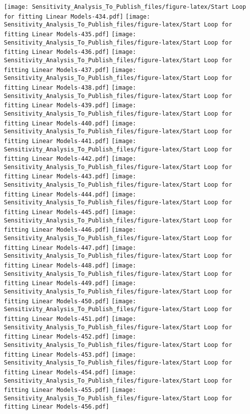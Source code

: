 \documentclass[
]{article}
\begin{document}
\texttt{[image: Sensitivity\_Analysis\_To\_Publish\_files/figure-latex/Start Loop for fitting Linear Models-434.pdf]}
\texttt{[image: Sensitivity\_Analysis\_To\_Publish\_files/figure-latex/Start Loop for fitting Linear Models-435.pdf]}
\texttt{[image: Sensitivity\_Analysis\_To\_Publish\_files/figure-latex/Start Loop for fitting Linear Models-436.pdf]}
\texttt{[image: Sensitivity\_Analysis\_To\_Publish\_files/figure-latex/Start Loop for fitting Linear Models-437.pdf]}
\texttt{[image: Sensitivity\_Analysis\_To\_Publish\_files/figure-latex/Start Loop for fitting Linear Models-438.pdf]}
\texttt{[image: Sensitivity\_Analysis\_To\_Publish\_files/figure-latex/Start Loop for fitting Linear Models-439.pdf]}
\texttt{[image: Sensitivity\_Analysis\_To\_Publish\_files/figure-latex/Start Loop for fitting Linear Models-440.pdf]}
\texttt{[image: Sensitivity\_Analysis\_To\_Publish\_files/figure-latex/Start Loop for fitting Linear Models-441.pdf]}
\texttt{[image: Sensitivity\_Analysis\_To\_Publish\_files/figure-latex/Start Loop for fitting Linear Models-442.pdf]}
\texttt{[image: Sensitivity\_Analysis\_To\_Publish\_files/figure-latex/Start Loop for fitting Linear Models-443.pdf]}
\texttt{[image: Sensitivity\_Analysis\_To\_Publish\_files/figure-latex/Start Loop for fitting Linear Models-444.pdf]}
\texttt{[image: Sensitivity\_Analysis\_To\_Publish\_files/figure-latex/Start Loop for fitting Linear Models-445.pdf]}
\texttt{[image: Sensitivity\_Analysis\_To\_Publish\_files/figure-latex/Start Loop for fitting Linear Models-446.pdf]}
\texttt{[image: Sensitivity\_Analysis\_To\_Publish\_files/figure-latex/Start Loop for fitting Linear Models-447.pdf]}
\texttt{[image: Sensitivity\_Analysis\_To\_Publish\_files/figure-latex/Start Loop for fitting Linear Models-448.pdf]}
\texttt{[image: Sensitivity\_Analysis\_To\_Publish\_files/figure-latex/Start Loop for fitting Linear Models-449.pdf]}
\texttt{[image: Sensitivity\_Analysis\_To\_Publish\_files/figure-latex/Start Loop for fitting Linear Models-450.pdf]}
\texttt{[image: Sensitivity\_Analysis\_To\_Publish\_files/figure-latex/Start Loop for fitting Linear Models-451.pdf]}
\texttt{[image: Sensitivity\_Analysis\_To\_Publish\_files/figure-latex/Start Loop for fitting Linear Models-452.pdf]}
\texttt{[image: Sensitivity\_Analysis\_To\_Publish\_files/figure-latex/Start Loop for fitting Linear Models-453.pdf]}
\texttt{[image: Sensitivity\_Analysis\_To\_Publish\_files/figure-latex/Start Loop for fitting Linear Models-454.pdf]}
\texttt{[image: Sensitivity\_Analysis\_To\_Publish\_files/figure-latex/Start Loop for fitting Linear Models-455.pdf]}
\texttt{[image: Sensitivity\_Analysis\_To\_Publish\_files/figure-latex/Start Loop for fitting Linear Models-456.pdf]}
\end{document}
